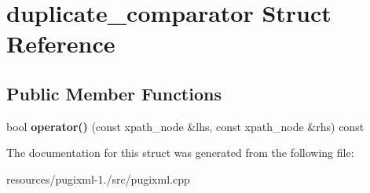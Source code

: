 \hypertarget{structduplicate__comparator}{\section{duplicate\+\_\+comparator Struct Reference}
\label{structduplicate__comparator}
}
\subsection*{Public Member Functions}
\begin{DoxyCompactItemize}
\item 
\hypertarget{structduplicate__comparator_afa36b2cf7af3e0bc7e41b03995bd99d3}{bool {\bfseries operator()} (const xpath\+\_\+node \&lhs, const xpath\+\_\+node \&rhs) const }\label{structduplicate__comparator_afa36b2cf7af3e0bc7e41b03995bd99d3}

\end{DoxyCompactItemize}


The documentation for this struct was generated from the following file\+:\begin{DoxyCompactItemize}
\item 
resources/pugixml-\/1./src/pugixml.\+cpp\end{DoxyCompactItemize}
